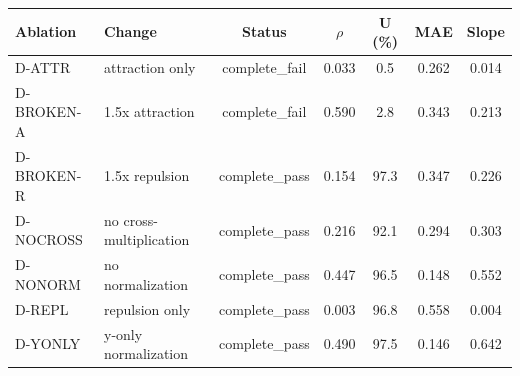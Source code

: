 \begin{tabular}{l l c c c c c}
\toprule
Ablation & Change & Status & $\rho$ & U (\%) & MAE & Slope \\
\midrule
D-ATTR & attraction only & complete\_fail & 0.033 & 0.5 & 0.262 & 0.014 \\
D-BROKEN-A & 1.5x attraction & complete\_fail & 0.590 & 2.8 & 0.343 & 0.213 \\
D-BROKEN-R & 1.5x repulsion & complete\_pass & 0.154 & 97.3 & 0.347 & 0.226 \\
D-NOCROSS & no cross-multiplication & complete\_pass & 0.216 & 92.1 & 0.294 & 0.303 \\
D-NONORM & no normalization & complete\_pass & 0.447 & 96.5 & 0.148 & 0.552 \\
D-REPL & repulsion only & complete\_pass & 0.003 & 96.8 & 0.558 & 0.004 \\
D-YONLY & y-only normalization & complete\_pass & 0.490 & 97.5 & 0.146 & 0.642 \\
\bottomrule
\end{tabular}
